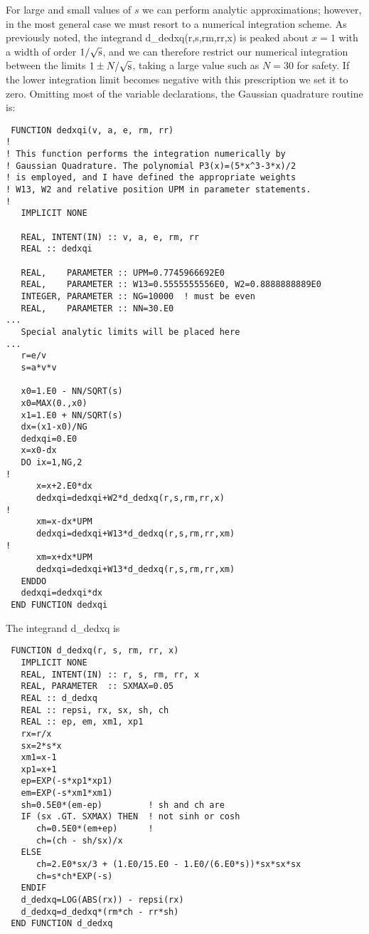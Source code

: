 \documentclass[preprint,12pt,eqsecnum,nofootinbib,amsmath,amssymb]{revtex4}
\begin{document}
For large and small values of $s$ we can perform analytic
approximations; however, in the most general case we must 
resort to a numerical integration scheme. As previously 
noted, the integrand d\_dedxq(r,s,rm,rr,x) is peaked  about 
$x=1$ with a width of order $1/\sqrt{{\rm s}}$, and we can
therefore restrict our numerical integration between the
limits $1 \pm N/\sqrt{{\rm s}}$, taking a large value such
as $N=30$ for safety. If the lower integration limit becomes 
negative with this prescription we set it to zero. Omitting
most of the variable declarations, the Gaussian quadrature 
routine is:


\vskip0.5cm 
{
\baselineskip12pt
\begin{verbatim}
 FUNCTION dedxqi(v, a, e, rm, rr)
!
! This function performs the integration numerically by
! Gaussian Quadrature. The polynomial P3(x)=(5*x^3-3*x)/2 
! is employed, and I have defined the appropriate weights 
! W13, W2 and relative position UPM in parameter statements. 
!
   IMPLICIT NONE     
  
   REAL, INTENT(IN) :: v, a, e, rm, rr
   REAL :: dedxqi
  
   REAL,    PARAMETER :: UPM=0.7745966692E0
   REAL,    PARAMETER :: W13=0.5555555556E0, W2=0.8888888889E0
   INTEGER, PARAMETER :: NG=10000  ! must be even
   REAL,    PARAMETER :: NN=30.E0
...
   Special analytic limits will be placed here    
...
   r=e/v
   s=a*v*v

   x0=1.E0 - NN/SQRT(s)
   x0=MAX(0.,x0)
   x1=1.E0 + NN/SQRT(s)
   dx=(x1-x0)/NG
   dedxqi=0.E0
   x=x0-dx
   DO ix=1,NG,2
!     
      x=x+2.E0*dx
      dedxqi=dedxqi+W2*d_dedxq(r,s,rm,rr,x)
!
      xm=x-dx*UPM
      dedxqi=dedxqi+W13*d_dedxq(r,s,rm,rr,xm)
!
      xm=x+dx*UPM
      dedxqi=dedxqi+W13*d_dedxq(r,s,rm,rr,xm)
   ENDDO
   dedxqi=dedxqi*dx
 END FUNCTION dedxqi
\end{verbatim}
}


\noindent
The integrand d\_dedxq is

{
\baselineskip12pt
\begin{verbatim}
 FUNCTION d_dedxq(r, s, rm, rr, x)
   IMPLICIT NONE
   REAL, INTENT(IN) :: r, s, rm, rr, x
   REAL, PARAMETER  :: SXMAX=0.05
   REAL :: d_dedxq
   REAL :: repsi, rx, sx, sh, ch
   REAL :: ep, em, xm1, xp1
   rx=r/x
   sx=2*s*x
   xm1=x-1
   xp1=x+1
   ep=EXP(-s*xp1*xp1)
   em=EXP(-s*xm1*xm1)
   sh=0.5E0*(em-ep)         ! sh and ch are 
   IF (sx .GT. SXMAX) THEN  ! not sinh or cosh
      ch=0.5E0*(em+ep)      ! 
      ch=(ch - sh/sx)/x
   ELSE
      ch=2.E0*sx/3 + (1.E0/15.E0 - 1.E0/(6.E0*s))*sx*sx*sx
      ch=s*ch*EXP(-s)
   ENDIF
   d_dedxq=LOG(ABS(rx)) - repsi(rx)
   d_dedxq=d_dedxq*(rm*ch - rr*sh)
 END FUNCTION d_dedxq
\end{verbatim}
}
\end{document}
